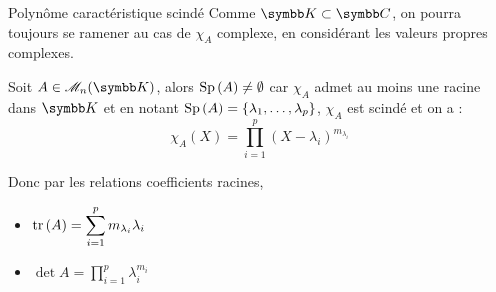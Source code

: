 \begin{proposition}{Polynôme caractéristique scindé}{}
    Comme $\K \subset \C$, on pourra toujours se ramener au cas de $\chi_A$ complexe, en 
    considérant les valeurs propres complexes.

    Soit $A \in \mathscr M_n(\K)$, alors $\operatorname{Sp} \,(A) \neq \emptyset$ car $\chi_A$ admet au moins une racine dans $\K$
    et en notant $\operatorname{Sp} \,(A) = \{\lambda_1, \ldots, \lambda_p \}$, $\chi_A$ est scindé et on a :
    $$\chi_A(X) = \prod_{i = 1 }^{ p } (X - \lambda_i)^{m_{\lambda_i}}$$

    Donc par les relations coefficients racines, 
    \begin{itemize}
        \item $\displaystyle \operatorname{tr} \,(A) = \sum_{i = 1 }^{ p } m_{\lambda_i} \lambda_i$ 
        \item $\displaystyle \det A = \prod_{i = 1 }^{ p } \lambda_i^{m_{i}}$
    \end{itemize}
\end{proposition}

